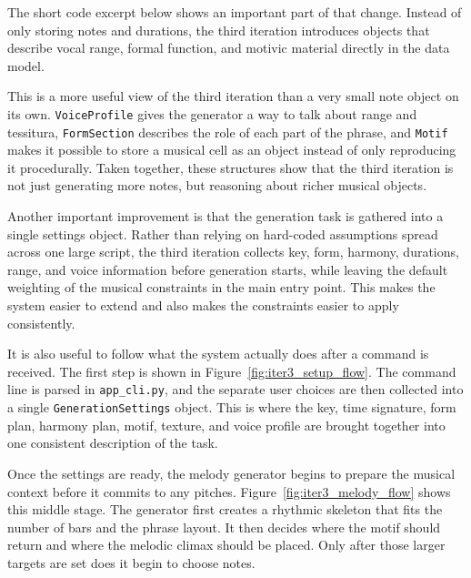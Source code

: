 

The short code excerpt below shows an important part of that change. Instead of only storing notes and durations, the third iteration introduces objects that describe vocal range, formal function, and motivic material directly in the data model.



This is a more useful view of the third iteration than a very small note object on its own. \texttt{VoiceProfile} gives the generator a way to talk about range and tessitura, \texttt{FormSection} describes the role of each part of the phrase, and \texttt{Motif} makes it possible to store a musical cell as an object instead of only reproducing it procedurally. Taken together, these structures show that the third iteration is not just generating more notes, but reasoning about richer musical objects.

Another important improvement is that the generation task is gathered into a single settings object. Rather than relying on hard-coded assumptions spread across one large script, the third iteration collects key, form, harmony, durations, range, and voice information before generation starts, while leaving the default weighting of the musical constraints in the main entry point. This makes the system easier to extend and also makes the constraints easier to apply consistently.

It is also useful to follow what the system actually does after a command is received. The first step is shown in Figure~\ref{fig:iter3_setup_flow}. The command line is parsed in \texttt{app\_cli.py}, and the separate user choices are then collected into a single \texttt{GenerationSettings} object. This is where the key, time signature, form plan, harmony plan, motif, texture, and voice profile are brought together into one consistent description of the task.



Once the settings are ready, the melody generator begins to prepare the musical context before it commits to any pitches. Figure~\ref{fig:iter3_melody_flow} shows this middle stage. The generator first creates a rhythmic skeleton that fits the number of bars and the phrase layout. It then decides where the motif should return and where the melodic climax should be placed. Only after those larger targets are set does it begin to choose notes.

